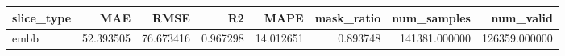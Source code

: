 \begin{tabular}{lrrrrrrr}
\toprule
slice_type & MAE & RMSE & R2 & MAPE & mask_ratio & num_samples & num_valid \\
\midrule
embb & 52.393505 & 76.673416 & 0.967298 & 14.012651 & 0.893748 & 141381.000000 & 126359.000000 \\
\bottomrule
\end{tabular}
